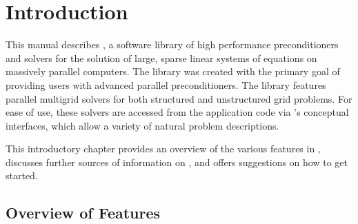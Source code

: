 
\chapter{Introduction}
\label{ch-Introduction}


This manual describes \hypre{}, a software library of high performance
preconditioners and solvers for the solution of large, sparse linear
systems of equations on massively parallel computers.  The \hypre{}
library was created with the primary goal of providing users with
advanced parallel preconditioners.  The library features parallel
multigrid solvers for both structured and unstructured grid problems.
For ease of use, these solvers are accessed from the application code
via \hypre{}'s conceptual interfaces, which allow a variety of natural
problem descriptions.

This introductory chapter provides an overview of the various features in
\hypre{}, discusses further sources of information on \hypre{}, and
offers suggestions on how to get started.




\section{Overview of Features}
\label{Features}

